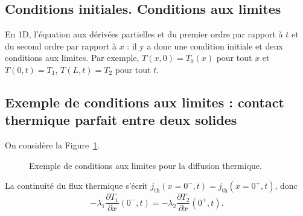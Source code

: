     \subsection{Conditions initiales. Conditions aux limites}

        En 1D, l'équation aux dérivées partielles et du premier ordre par rapport à $t$ et du second ordre par rapport à $x$ : il y a donc une condition initiale et deux conditions aux limites. Par exemple, $T(x,0)=T_0(x)$ pour tout $x$ et $T(0,t)=T_1$, $T(L,t)=T_2$ pour tout $t$.

    \subsection[Exemple de conditions aux limites]{Exemple de conditions aux limites : contact\texorpdfstring{\\}{ }thermique parfait entre deux solides}

        On considère la Figure~\ref{fig:contact_thermique_parfait_deux_solides}.

        \begin{figure}
            \centering
            \caption{Exemple de conditions aux limites pour la diffusion thermique.}    
            \label{fig:contact_thermique_parfait_deux_solides}
        \end{figure}

        La continuité du flux thermique s'écrit $j_{\text{th}}(x=0^{-},t)=j_{\text{th}}(x=0^{+},t)$, donc
        \begin{equation}
            \boxed{
                -\lambda_1\frac{\partial T_1}{\partial x}(0^{-},t)=-\lambda_2\frac{\partial T_2}{\partial x}(0^{+},t).
            }
        \end{equation}

